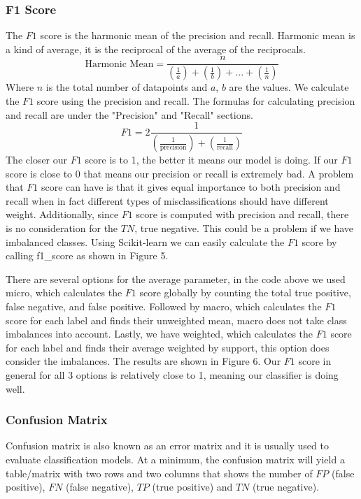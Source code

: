 \documentclass[a4paper,12pt]{report}
\begin{document}
\subsubsection{F1 Score}

The $F1$ score is the harmonic mean of the precision and recall. Harmonic mean is a kind of average, it is the reciprocal of the average of the reciprocals.
$$\text{Harmonic Mean}=\frac{n}{(\frac{1}{a})+(\frac{1}{b})+...+(\frac{1}{n})}$$
Where $n$ is the total number of datapoints and $a$, $b$ are the values.
We calculate the $F1$ score using the precision and recall. The formulas for calculating precision and recall are under the "Precision" and "Recall" sections. 
$$F1=2\frac{1}{(\frac{1}{\text{precision}})+(\frac{1}{\text{recall}})}$$
The closer our $F1$ score is to 1, the better it means our model is doing. If our $F1$ score is close to 0 that means our precision or recall is extremely bad. A problem that $F1$ score can have is that it gives equal importance to both precision and recall when in fact different types of misclassifications should have different weight. Additionally, since $F1$ score is computed with precision and recall, there is no consideration for the $TN$, true negative. This could be a problem if we have imbalanced classes. Using Scikit-learn we can easily calculate the $F1$ score by calling f1\_score as shown in Figure 5.


There are several options for the average parameter, in the code above we used micro, which calculates the $F1$ score globally by counting the total true positive, false negative, and false positive. Followed by macro, which calculates the $F1$ score for each label and finds their unweighted mean, macro does not take class imbalances into account. Lastly, we have weighted, which calculates the $F1$ score for each label and finds their average weighted by support, this option does consider the imbalances. The results are shown in Figure 6. Our $F1$ score in general for all 3 options is relatively close to 1, meaning our classifier is doing well.


\subsubsection{Confusion Matrix}

Confusion matrix is also known as an error matrix and it is usually used to evaluate classification models. At a minimum, the confusion matrix will yield a table/matrix with two rows and two columns that shows the number of $FP$ (false positive), $FN$ (false negative), $TP$ (true positive) and $TN$ (true negative).
\end{document}
